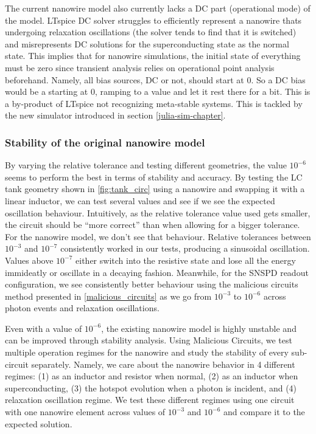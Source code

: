 The current nanowire model also currently lacks a DC part (operational mode) 
of the model.
LTspice DC solver struggles to efficiently represent a nanowire thats
undergoing relaxation oscillations (the solver tends to find that it is
switched) and misrepresents DC solutions for the superconducting state
as the normal state. This implies that for nanowire simulations,
the initial state of everything must be zero since transient analysis relies
on operational point analysis beforehand. Namely, all bias sources,
DC or not, should start at $0$. So a DC bias would be a  starting
at 0, ramping to a value and let it rest there for a bit. This is a by-product 
of LTspice not recognizing meta-stable systems. This is tackled by the new 
simulator introduced in section \ref{julia-sim-chapter}.

\subsubsection{Stability of the original nanowire model}

By varying the relative tolerance and testing different geometries, the value $10^{-6}$
seems to perform the best in terms of stability and accuracy. By testing the LC tank
geometry shown in \ref{fig:tank_circ} using a nanowire and swapping it with a linear 
inductor, we can test several  values and see if we see the expected 
oscillation behaviour. Intuitively, as the relative tolerance value used gets smaller,
the circuit should be ``more correct'' than when allowing for a bigger tolerance.
For the nanowire model, we don't see that behaviour. Relative tolerances between $10^{-3}$
and $10^{-7}$
consistently worked in our tests, producing a sinusoidal oscillation. Values
above $10^{-7}$ either switch into the resistive state and lose all the energy immideatly
or oscillate in a decaying fashion. Meanwhile, for the SNSPD readout configuration,
we see consistently better behaviour using the malicious circuits method presented in
\ref{malicious_circuits} as we go from $10^{-3}$ to $10^{-6}$ across photon events
and relaxation oscillations.

Even with a  value of $10^{-6}$, the existing nanowire model is highly unstable
and can be improved through stability analysis.
Using Malicious Circuits, we test multiple operation regimes for
the nanowire and study the stability of every sub-circuit separately. Namely,
we care about the nanowire behavior in 4 different regimes: 
(1) as an inductor and resistor when normal, 
(2) as an inductor when superconducting, (3) the hotspot evolution when a photon is
incident, and (4) relaxation oscillation regime. We test these different regimes 
using one circuit with one nanowire element across  values of $10^{-3}$
and $10^{-6}$ and compare it to the expected solution.


